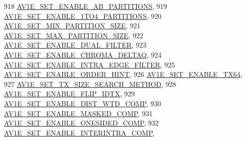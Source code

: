 \begin{DoxyCodeInclude}
{{{{{{{918                                         \hyperlink{group__aom__encoder_ggae78dde67a6d78f332e9bdba0dde42db5a3f494511b35631e4d400f4df9a48c6dc}{AV1E\_SET\_ENABLE\_AB\_PARTITIONS},
919                                         \hyperlink{group__aom__encoder_ggae78dde67a6d78f332e9bdba0dde42db5ab2b627e9fad54fd84b18e73d8f6a8a51}{AV1E\_SET\_ENABLE\_1TO4\_PARTITIONS},
920                                         \hyperlink{group__aom__encoder_ggae78dde67a6d78f332e9bdba0dde42db5a4c1444fdafd3577606cef60afb33124c}{AV1E\_SET\_MIN\_PARTITION\_SIZE},
921                                         \hyperlink{group__aom__encoder_ggae78dde67a6d78f332e9bdba0dde42db5ab15141c333da6ddb99c5f2aeea934958}{AV1E\_SET\_MAX\_PARTITION\_SIZE},
922                                         \hyperlink{group__aom__encoder_ggae78dde67a6d78f332e9bdba0dde42db5a45867a101866f7ad1a67e7d72f84054a}{AV1E\_SET\_ENABLE\_DUAL\_FILTER},
923                                         \hyperlink{group__aom__encoder_ggae78dde67a6d78f332e9bdba0dde42db5a44ca96b0fd8b3f6d094d7b430c7c3043}{AV1E\_SET\_ENABLE\_CHROMA\_DELTAQ},
924                                         \hyperlink{group__aom__encoder_ggae78dde67a6d78f332e9bdba0dde42db5a518cc32bbf169f8e9d4d71e7c1193748}{AV1E\_SET\_ENABLE\_INTRA\_EDGE\_FILTER},
925                                         \hyperlink{group__aom__encoder_ggae78dde67a6d78f332e9bdba0dde42db5ad0eaf349d653c8357acbba84ad95d5e6}{AV1E\_SET\_ENABLE\_ORDER\_HINT},
926                                         \hyperlink{group__aom__encoder_ggae78dde67a6d78f332e9bdba0dde42db5ab6d4110cee235e35452d0beb89a28604}{AV1E\_SET\_ENABLE\_TX64},
927                                         \hyperlink{group__aom__encoder_ggae78dde67a6d78f332e9bdba0dde42db5a37bc192f2194b5c19350a096f59aa51d}{AV1E\_SET\_TX\_SIZE\_SEARCH\_METHOD},
928                                         \hyperlink{group__aom__encoder_ggae78dde67a6d78f332e9bdba0dde42db5a6c1d6fd0a0607d07cb648e4fe6702780}{AV1E\_SET\_ENABLE\_FLIP\_IDTX},
929                                         \hyperlink{group__aom__encoder_ggae78dde67a6d78f332e9bdba0dde42db5a80d59744d531d9e0d48c8274792b69dc}{AV1E\_SET\_ENABLE\_DIST\_WTD\_COMP},
930                                         \hyperlink{group__aom__encoder_ggae78dde67a6d78f332e9bdba0dde42db5a643067b985c437490d6248decad39235}{AV1E\_SET\_ENABLE\_MASKED\_COMP},
931                                         \hyperlink{group__aom__encoder_ggae78dde67a6d78f332e9bdba0dde42db5adff1eda391fbe14b50ed48633dda01dc}{AV1E\_SET\_ENABLE\_ONESIDED\_COMP},
932                                         \hyperlink{group__aom__encoder_ggae78dde67a6d78f332e9bdba0dde42db5a4032b6c7ad5f4499af95ddaab863d3d6}{AV1E\_SET\_ENABLE\_INTERINTRA\_COMP},
}}}}}}}
\end{DoxyCodeInclude}
